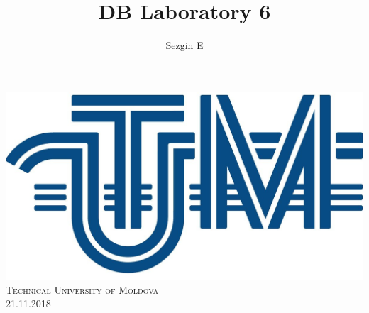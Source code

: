 \documentclass[12pt]{article}
\title{DB Laboratory 6}
\author{Sezgin E}
\begin{document}
        
        
        \begin{titlepage}
                \centering
                \vspace*{0.5 cm}
                \includegraphics[scale = 0.11]{LOGO_UTM.jpg}\\[1.0 cm]	%
                \textsc{\LARGE Technical University of Moldova}\\[2.0 cm]%
                \textsc{\Large 21.11.2018}\\[0.5 cm]		%


\end{titlepage}
\end{document}
